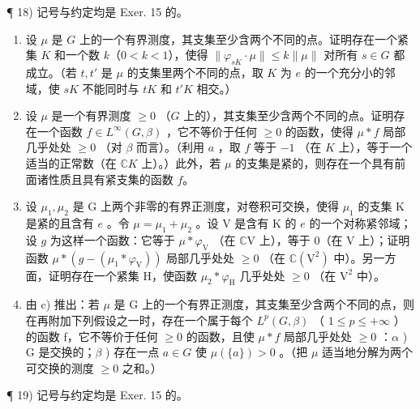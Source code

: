 ¶ 18) 记号与约定均是 Exer. 15 的。

\begin{enumerate}
\def\labelenumi{\alph{enumi})}
\item
  设 \(\mu\) 是 \(G\) 上的一个有界测度，其支集至少含两个不同的点。证明存在一个紧集 \(K\) 和一个数 \(k\)（\(0 < k < 1\)），使得 \(\| \varphi_{sK} \cdot \mu \| \leqslant k \| \mu \|\) 对所有 \(s \in G\) 都成立。（若 \(t, t'\) 是 \(\mu\) 的支集里两个不同的点，取 \(K\) 为 \(e\) 的一个充分小的邻域，使 \(sK\) 不能同时与 \(tK\) 和 \(t'K\) 相交。）
\item
  设 \(\mu\) 是一个有界测度 \(\geqslant 0\) （\(G\) 上的），其支集至少含两个不同的点。证明存在一个函数 \(f \in L^{\infty}(G, \beta)\) ，它不等价于任何 \(\geqslant 0\) 的函数，使得 \(\mu * f\) 局部几乎处处 \(\geqslant 0\) （对 \(\beta\) 而言）。（利用 \(a\) ，取 \(f\) 等于 \(-1\) （在 \(K\) 上），等于一个适当的正常数（在 \(\mathbb{C}K\) 上）。）此外，若 \(\mu\) 的支集是紧的，则存在一个具有前面诸性质且具有紧支集的函数 \(f\)。
\item
  设 \(\mu_{1},\mu_{2}\) 是 G 上两个非零的有界正测度，对卷积可交换，使得 \(\mu_{1}\) 的支集 K 是紧的且含有 \(e\) 。令 \(\mu = \mu_{1} + \mu_{2}\) 。设 V 是含有 K 的 \(e\) 的一个对称紧邻域；设 \(g\) 为这样一个函数：它等于 \(\mu * \varphi_{\mathrm{V}}\) （在 \(\mathbb{C}\mathrm{V}\) 上），等于 0（在 V 上）；证明函数 \(\mu * (g - (\mu_1 * \varphi_{\mathrm{V}}))\) 局部几乎处处 \(\geqslant 0\) （在 \(\mathbb{C}(\mathrm{V}^2)\) 中）。另一方面，证明存在一个紧集 H，使函数 \(\mu_{2} * \varphi_{\mathrm{H}}\) 几乎处处 \(\geqslant 0\) （在 \(\mathrm{V}^2\) 中）。
\item
  由 c) 推出：若 \(\mu\) 是 G 上的一个有界正测度，其支集至少含两个不同的点，则在再附加下列假设之一时，存在一个属于每个 \(L^{p}(G,\beta)\) （ \(1 \leqslant p \leqslant +\infty\) ）的函数 f，它不等价于任何 \(\geqslant 0\) 的函数，且使 \(\mu * f\) 局部几乎处处 \(\geqslant 0\) ：\(\alpha\) ) G 是交换的；\(\beta\) ) 存在一点 \(a \in G\) 使 \(\mu(\{a\}) > 0\) 。（把 \(\mu\) 适当地分解为两个可交换的测度 \(\geqslant 0\) 之和。）
\end{enumerate}

¶ 19) 记号与约定均是 Exer. 15 的。

